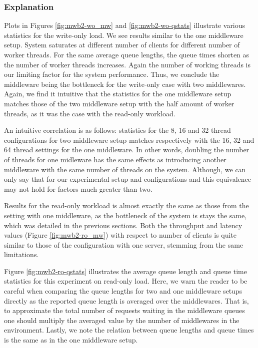 \documentclass[11pt,a4paper]{article}
\begin{document}
\subsubsection{Explanation} \label{sec:mwb2-exp}
Plots in Figures \ref{fig:mwb2-wo_mw} and \ref{fig:mwb2-wo-qstats} illustrate various statistics for the write-only load. We see results similar to the one middleware setup. System saturates at different number of clients for different number of worker threads. For the same average queue lengths, the queue times shorten as the number of worker threads increases. Again the number of working threads is our limiting factor for the system performance. Thus, we conclude the middleware being the bottleneck for the write-only case with two middlewares. Again, we find it intuitive that the statistics for the one middleware setup matches those of the two middleware setup with the half amount of worker threads, as it was the case with the read-only workload.
\par An intuitive correlation is as follows: statistics for the 8, 16 and 32 thread configurations for two middleware setup matches respectively with the 16, 32 and 64 thread settings for the one middleware. In other words, doubling the number of threads for one midleware has the same effects as introducing another middleware with the same number of threads on the system. Although, we can only say that for our experimental setup and configurations and this equivalence may not hold for factors much greater than two.
\par Results for the read-only workload is almost exactly the same as those from the setting with one middleware, as the bottleneck of the system is stays the same, which was detailed in the previous sections. Both the throughput and latency values (Figure \ref{fig:mwb2-ro_mw}) with respect to number of clients is quite similar to those of the configuration with one server, stemming from the same limitations.
\par Figure \ref{fig:mwb2-ro-qstats} illustrates the average queue length and queue time statistics for this experiment on read-only load. Here, we warn the reader to be careful when comparing the queue lengths for two and one middleware setups directly as the reported queue length is averaged over the middlewares. That is, to approximate the total number of requests waiting in the middleware queues one should multiply the averaged value by the number of middlewares in the environment. Lastly, we note the relation between queue lengths and queue times is the same as in the one middleware setup.
\end{document}

